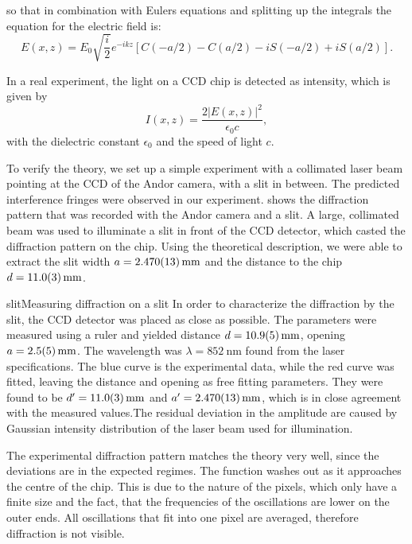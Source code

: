 so that in combination with Eulers equations and splitting up the integrals the equation for the electric field is:
\begin{equation}
E(x,z) = E_0 \sqrt{\frac{i}{2}} e^{-ikz} \left [ C(-a/2) - C(a/2) - iS(-a/2) + iS(a/2) \right ].
\end{equation}

In a real experiment, the light on a CCD chip is detected as intensity, which is given by
\begin{equation}
I(x,z) = \frac{2 \lvert E(x,z) \rvert ^2}{\epsilon_0 c} ,
\end{equation}
with the dielectric constant $\epsilon_0$ and the speed of light $c$.

To verify the theory, we set up a simple experiment with a collimated laser beam pointing at the CCD of the Andor camera, with a slit in between. The predicted interference fringes were observed in our experiment.  shows the diffraction pattern that was recorded with the Andor camera and a slit. A large, collimated beam was used to illuminate a slit in front of the CCD detector, which casted the diffraction pattern on the chip. Using the theoretical description, we were able to extract the slit width $a=\SI{2.470\pm0.013}{\milli\meter}$ and the distance to the chip $d=\SI{11.0\pm0.3}{\milli\meter}$.

\pltCustom{
	\begin{center}
		
		
	\end{center}
}
{slit}{Measuring diffraction on a slit}{
	In order to characterize the diffraction by the slit, the CCD detector was placed as close as possible. The parameters were measured using a ruler and yielded distance $d=\SI{10.9\pm0.5}{\milli\meter}$, opening $a=\SI{2.5\pm0.5}{\milli\meter}$. The wavelength was $\lambda =\SI{852}{\nano\meter}$ found from the laser specifications. The blue curve is the experimental data, while the red curve was fitted, leaving the distance and opening as free fitting parameters. They were found to be $d^\prime=\SI{11.0\pm0.3}{\milli\meter}$ and $a^\prime=\SI{2.470\pm0.013}{\milli\meter}$, which is in close agreement with the measured values.The residual deviation in the amplitude are caused by Gaussian intensity distribution of the laser beam used for illumination.
}

The experimental diffraction pattern matches the theory very well, since the deviations are in the expected regimes.
The function washes out as it approaches the centre of the chip. This is due to the nature of the pixels, which only have a finite size and the fact, that the frequencies of the oscillations are lower on the outer ends. All oscillations that fit into one pixel are averaged, therefore diffraction is not visible.

